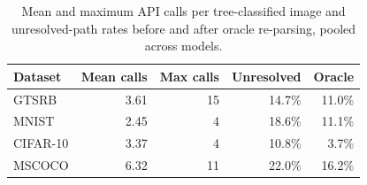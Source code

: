 \begin{table}[t]
\centering
\caption{Mean and maximum API calls per tree-classified image and unresolved-path rates before and after oracle re-parsing, pooled across models.}
\label{tab:inference_cost}
\footnotesize
\begin{tabular}{@{}lrrrr@{}}
\toprule
\textbf{Dataset} & \textbf{Mean calls} & \textbf{Max calls} & \textbf{Unresolved} & \textbf{Oracle} \\
\midrule
GTSRB & 3.61 & 15 & 14.7\% & 11.0\% \\
MNIST & 2.45 & 4 & 18.6\% & 11.1\% \\
CIFAR-10 & 3.37 & 4 & 10.8\% & 3.7\% \\
MSCOCO & 6.32 & 11 & 22.0\% & 16.2\% \\
\bottomrule
\end{tabular}
\end{table}
